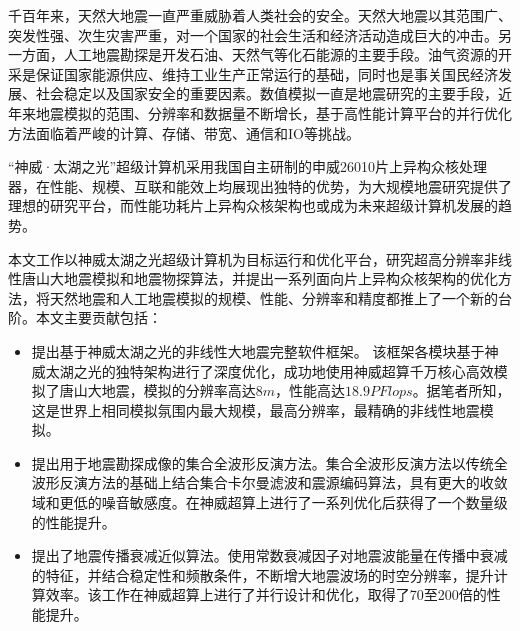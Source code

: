 \begin{cabstract}
千百年来，天然大地震一直严重威胁着人类社会的安全。天然大地震以其范围广、突发性强、次生灾害严重，对一个国家的社会生活和经济活动造成巨大的冲击。另一方面，人工地震勘探是开发石油、天然气等化石能源的主要手段。油气资源的开采是保证国家能源供应、维持工业生产正常运行的基础，同时也是事关国民经济发展、社会稳定以及国家安全的重要因素。数值模拟一直是地震研究的主要手段，近年来地震模拟的范围、分辨率和数据量不断增长，基于高性能计算平台的并行优化方法面临着严峻的计算、存储、带宽、通信和IO等挑战。

“神威·太湖之光”超级计算机采用我国自主研制的申威26010片上异构众核处理器，在性能、规模、互联和能效上均展现出独特的优势，为大规模地震研究提供了理想的研究平台，而性能功耗片上异构众核架构也或成为未来超级计算机发展的趋势。

本文工作以神威太湖之光超级计算机为目标运行和优化平台，研究超高分辨率非线性唐山大地震模拟和地震物探算法，并提出一系列面向片上异构众核架构的优化方法，将天然地震和人工地震模拟的规模、性能、分辨率和精度都推上了一个新的台阶。本文主要贡献包括：
  \begin{itemize}
    \item 提出基于神威太湖之光的非线性大地震完整软件框架。
    该框架各模块基于神威太湖之光的独特架构进行了深度优化，成功地使用神威超算千万核心高效模拟了唐山大地震，模拟的分辨率高达$8m$，性能高达$18.9PFlops$。据笔者所知，这是世界上相同模拟氛围内最大规模，最高分辨率，最精确的非线性地震模拟。
    \item 提出用于地震勘探成像的集合全波形反演方法。集合全波形反演方法以传统全波形反演方法的基础上结合集合卡尔曼滤波和震源编码算法，具有更大的收敛域和更低的噪音敏感度。在神威超算上进行了一系列优化后获得了一个数量级的性能提升。
    \item 提出了地震传播衰减近似算法。使用常数衰减因子对地震波能量在传播中衰减的特征，并结合稳定性和频散条件，不断增大地震波场的时空分辨率，提升计算效率。该工作在神威超算上进行了并行设计和优化，取得了70至200倍的性能提升。
  \end{itemize}



\end{cabstract}

